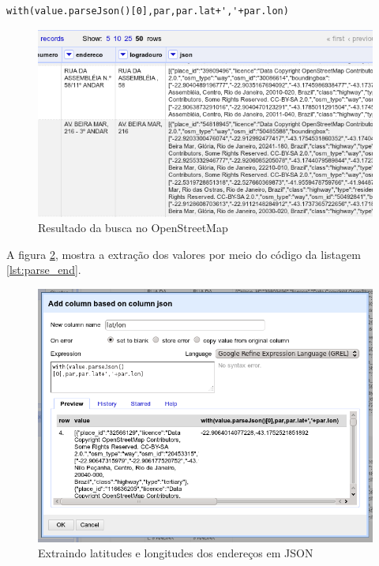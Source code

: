 \documentclass[a4paper,10pt]{report}
\begin{document}
\begin{lstlisting}[label=lst:parse_end,caption=Extraindo latitudes e longitudes dos endereços em JSON]
 with(value.parseJson()[0],par,par.lat+','+par.lon)
\end{lstlisting}


\begin{figure}[h!]
 \includegraphics[width=12cm]{./end_json.png}
 \caption{Resultado da busca no OpenStreetMap}
 \label{fig:endjson}
\end{figure}


A figura \ref{fig:parsejson}, mostra a extração dos valores por meio do código da listagem \ref{lst:parse_end}. 

\begin{figure}[h!]
 \includegraphics[width=12cm]{./Parse_end_json.png}
 \caption{Extraindo latitudes e longitudes dos endereços em JSON}
 \label{fig:parsejson}
\end{figure}
\end{document}
